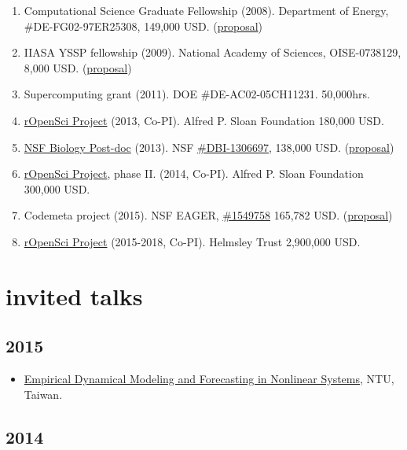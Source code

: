 \documentclass[11pt,a4paper,sans]{moderncv}        %
\makeatletter
\providecommand{\tightlist}{%
    \setlength{\itemsep}{0pt}\setlength{\parskip}{0pt}}
\renewcommand{\labelenumi}{\@biblabel{\theenumi}} %
\makeatother
\begin{document}
\begin{enumerate}
\def\labelenumi{\arabic{enumi}.}
\item
  Computational Science Graduate Fellowship (2008). Department of
  Energy, \#DE-FG02-97ER25308, 149,000 USD.
  (\href{https://dx.doi.org/10.6084/m9.figshare.2010246}{proposal})
\item
  IIASA YSSP fellowship (2009). National Academy of Sciences,
  OISE-0738129, 8,000 USD.
  (\href{http://doi.org/10.6084/m9.figshare.678310}{proposal})
\item
  Supercomputing grant (2011). DOE \#DE-AC02-05CH11231. 50,000hrs.
\item
  \href{http://ropensci.org}{rOpenSci Project} (2013, Co-PI). Alfred P.
  Sloan Foundation 180,000 USD.
\item
  \href{http://www.nsf.gov/pubs/2012/nsf12497/nsf12497.htm}{NSF Biology
  Post-doc} (2013). NSF
  \href{http://www.nsf.gov/awardsearch/showAward?AWD_ID=1306697}{\#DBI-1306697},
  138,000 USD.
  (\href{http://doi.org/10.6084/m9.figshare.652970}{proposal})
\item
  \href{http://ropensci.org}{rOpenSci Project}, phase II. (2014, Co-PI).
  Alfred P. Sloan Foundation 300,000 USD.
\item
  Codemeta project (2015). NSF EAGER,
  \href{https://www.nsf.gov/awardsearch/showAward?AWD_ID=1549758}{\#1549758}
  165,782 USD.
  (\href{https://dx.doi.org/10.6084/m9.figshare.2055972}{proposal})
\item
  \href{http://ropensci.org}{rOpenSci Project} (2015-2018, Co-PI).
  Helmsley Trust 2,900,000 USD.
\end{enumerate}

\section{invited talks}\label{invited-talks}

\subsection{2015}\label{section}

\begin{itemize}
\tightlist
\item
  \href{http://ecows.oc.ntu.edu.tw/itnlws/}{Empirical Dynamical Modeling
  and Forecasting in Nonlinear Systems}, NTU, Taiwan.
\end{itemize}

\subsection{2014}\label{section-1}
\end{document}
